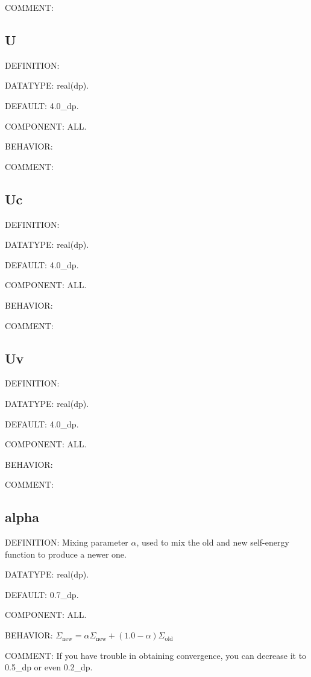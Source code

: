 {\color{olive}COMMENT:}

\subsection{U}
{\color{red}DEFINITION:}

{\color{green}DATATYPE:} real(dp).

{\color{blue}DEFAULT:} 4.0\_dp.

{\color{brown}COMPONENT:} ALL.

{\color{purple}BEHAVIOR:}

{\color{olive}COMMENT:}

\subsection{Uc}
{\color{red}DEFINITION:}

{\color{green}DATATYPE:} real(dp).

{\color{blue}DEFAULT:} 4.0\_dp.

{\color{brown}COMPONENT:} ALL.

{\color{purple}BEHAVIOR:}

{\color{olive}COMMENT:}

\subsection{Uv}
{\color{red}DEFINITION:}

{\color{green}DATATYPE:} real(dp).

{\color{blue}DEFAULT:} 4.0\_dp.

{\color{brown}COMPONENT:} ALL.

{\color{purple}BEHAVIOR:}

{\color{olive}COMMENT:}

\subsection{alpha}
{\color{red}DEFINITION:} Mixing parameter $\alpha$, used to mix the old and new self-energy function to produce a newer one.

{\color{green}DATATYPE:} real(dp).

{\color{blue}DEFAULT:} 0.7\_dp.

{\color{brown}COMPONENT:} ALL.

{\color{purple}BEHAVIOR:} $\Sigma_{\text{new}} = \alpha \Sigma_{\text{new}} + (1.0 - \alpha) \Sigma_{\text{old}}$

{\color{olive}COMMENT:} If you have trouble in obtaining convergence, you can decrease it to 0.5\_dp or even 0.2\_dp.

